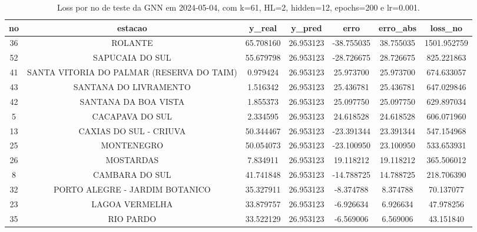 \begin{table}[h]
\centering
\caption{Loss por no de teste da GNN em 2024-05-04, com k=61, HL=2, hidden=12, epochs=200 e lr=0.001.}
\label{tab:gnn_loss_k61_hl2_h12_e200_d20240504}
\begin{tabular}{ccccccc}
\toprule
no & estacao & y\_real & y\_pred & erro & erro\_abs & loss\_no \\
\midrule
36 & ROLANTE & 65.708160 & 26.953123 & -38.755035 & 38.755035 & 1501.952759 \\
52 & SAPUCAIA DO SUL & 55.679798 & 26.953123 & -28.726675 & 28.726675 & 825.221863 \\
41 & SANTA VITORIA DO PALMAR (RESERVA DO TAIM) & 0.979424 & 26.953123 & 25.973700 & 25.973700 & 674.633057 \\
43 & SANTANA DO LIVRAMENTO & 1.516342 & 26.953123 & 25.436781 & 25.436781 & 647.029846 \\
42 & SANTANA DA BOA VISTA & 1.855373 & 26.953123 & 25.097750 & 25.097750 & 629.897034 \\
5 & CACAPAVA DO SUL & 2.334595 & 26.953123 & 24.618528 & 24.618528 & 606.071960 \\
13 & CAXIAS DO SUL - CRIUVA & 50.344467 & 26.953123 & -23.391344 & 23.391344 & 547.154968 \\
25 & MONTENEGRO & 50.054073 & 26.953123 & -23.100950 & 23.100950 & 533.653931 \\
26 & MOSTARDAS & 7.834911 & 26.953123 & 19.118212 & 19.118212 & 365.506012 \\
8 & CAMBARA DO SUL & 41.741848 & 26.953123 & -14.788725 & 14.788725 & 218.706390 \\
32 & PORTO ALEGRE - JARDIM BOTANICO & 35.327911 & 26.953123 & -8.374788 & 8.374788 & 70.137077 \\
23 & LAGOA VERMELHA & 33.879757 & 26.953123 & -6.926634 & 6.926634 & 47.978256 \\
35 & RIO PARDO & 33.522129 & 26.953123 & -6.569006 & 6.569006 & 43.151840 \\
\bottomrule
\end{tabular}
\end{table}

